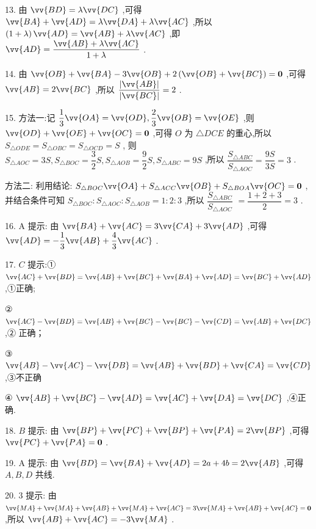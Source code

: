 13. 由 $\vv{BD} = \lambda \vv{DC}$ ,可得 $\vv{BA} + \vv{AD} = \lambda \vv{DA} + \lambda \vv{AC}$ ,所以 $\left( {1 + \lambda }\right) \vv{AD} = \vv{AB} + \lambda \vv{AC}$ ,即 $\vv{AD} = \dfrac{\vv{AB} + \lambda \vv{AC}}{1 + \lambda }$ .

14. 由 $\vv{OB} + \vv{BA} - 3\vv{OB} + 2\left( {\vv{OB} + \vv{BC}}\right)  = \mathbf{0}$ ,可得 $\vv{AB} = 2\vv{BC}$ ,所以 $\dfrac{\left| \vv{AB}\right| }{\left| \vv{BC}\right| } = 2$ .

15. 方法一:记 $\dfrac{1}{3}\vv{OA} = \vv{OD},\dfrac{2}{3}\vv{OB} = \vv{OE}$ ,则 $\vv{OD} + \vv{OE} + \vv{OC} = \mathbf{0}$ ,可得 $O$ 为 $\bigtriangleup  {DCE}$ 的重心,所以 ${S}_{\bigtriangleup {ODE}} = {S}_{\bigtriangleup {OBC}} = {S}_{\bigtriangleup {OCD}} = S$ , 则 ${S}_{\bigtriangleup {AOC}} = {3S},{S}_{\bigtriangleup {BOC}} = \dfrac{3}{2}S,{S}_{\bigtriangleup {AOB}} = \dfrac{9}{2}S,{S}_{\bigtriangleup {ABC}} = {9S}$ ,所以 $\dfrac{{S}_{\bigtriangleup {ABC}}}{{S}_{\bigtriangleup {AOC}}} = \dfrac{9S}{3S} = 3$ .

方法二: 利用结论: ${S}_{\bigtriangleup {BOC}}\vv{OA} + {S}_{\bigtriangleup {ACC}}\vv{OB} + {S}_{\bigtriangleup {BOA}}\vv{OC} = \mathbf{0}$ ,并结合条件可知 ${S}_{\bigtriangleup {BOC}} : {S}_{\bigtriangleup {AOC}} : {S}_{\bigtriangleup {AOB}} = 1 : 2 : 3$ ,所以 $\dfrac{{S}_{\bigtriangleup {ABC}}}{{S}_{\bigtriangleup {AOC}}}$  $= \dfrac{1 + 2 + 3}{2} = 3$ .

16. A 提示: 由 $\vv{BA} + \vv{AC} = 3\vv{CA} + 3\vv{AD}$ ,可得 $\vv{AD} =  - \dfrac{1}{3}\vv{AB} + \dfrac{4}{3}\vv{AC}$ .

17. $C$ 提示:① $\vv{AC} + \vv{BD} = \vv{AB} + \vv{BC} + \vv{BA} + \vv{AD} = \vv{BC} + \vv{AD}$ ,①正确;

② $\vv{AC} - \vv{BD} = \vv{AB} + \vv{BC} - \vv{BC} - \vv{CD} = \vv{AB} + \vv{DC}$ ,② 正确；

③ $\vv{AB} - \vv{AC} - \vv{DB} = \vv{AB} + \vv{BD} + \vv{CA} = \vv{CD}$ ,③不正确

④ $\vv{AB} + \vv{BC} - \vv{AD} = \vv{AC} + \vv{DA} = \vv{DC}$ ,④正确.

18. $B$ 提示: 由 $\vv{BP} + \vv{PC} + \vv{BP} + \vv{PA} = 2\vv{BP}$ ,可得 $\vv{PC} + \vv{PA} = \mathbf{0}$ .

19. A 提示: 由 $\vv{BD} = \vv{BA} + \vv{AD} = {2a} + {4b} = 2\vv{AB}$ ,可得 $A,B,D$ 共线.

20. 3 提示: 由 $\vv{MA} + \vv{MA} + \vv{AB} + \vv{MA} + \vv{AC} = 3\vv{MA} + \vv{AB} + \vv{AC} = \mathbf{0}$ ,所以 $\vv{AB} + \vv{AC} =  - 3\vv{MA}$ .

